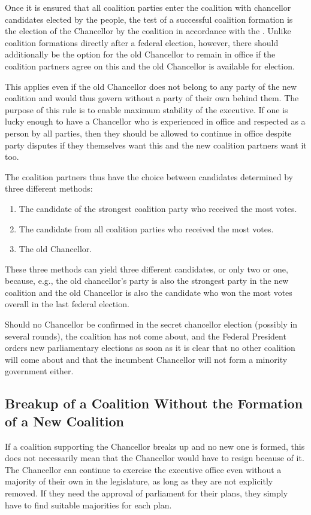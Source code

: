 Once it is ensured that all coalition parties enter the coalition with chancellor candidates elected by the people, the test of a
successful coalition formation is the election of the Chancellor by the coalition in accordance with the .
Unlike coalition formations directly after a federal election, however, there should additionally be the option for
the old Chancellor to remain in office if the coalition partners agree on this and the old Chancellor is available
for election.

This applies even if the old Chancellor does not belong to any party of the new coalition and would thus govern without a party of their own
behind them.
The purpose of this rule is to enable maximum stability of the executive.
If one is lucky enough to have a Chancellor who is experienced in office and respected as a person by all
parties, then they should be allowed to continue in office despite party disputes if they themselves
want this and the new coalition partners want it too.

The coalition partners thus have the choice between candidates determined by three different methods:
\begin{enumerate}[label=\alph*)]
  \item The candidate of the strongest coalition party who received the most votes.
  \item The candidate from all coalition parties who received the most votes.
  \item The old Chancellor.
\end{enumerate}

These three methods can yield three different candidates, or only two or one, because, e.g.,
the old chancellor's party is also the strongest party in the new coalition and the old Chancellor is also
the candidate who won the most votes overall in the last federal election.

Should no Chancellor be confirmed in the secret chancellor election (possibly in several rounds), the coalition
has not come about, and the Federal President orders new parliamentary elections as soon as it is clear that no other coalition
will come about and that the incumbent Chancellor will not form a minority government either.

\subsection{Breakup of a Coalition Without the Formation of a New Coalition}
If a coalition supporting the Chancellor breaks up and no new one is formed, this does not necessarily mean that
the Chancellor would have to resign because of it.
The Chancellor can continue to exercise the executive office even without a majority of their own in the legislature, as long as they are not explicitly removed.
If they need the approval of parliament for their plans, they simply have to find suitable majorities for each plan.

